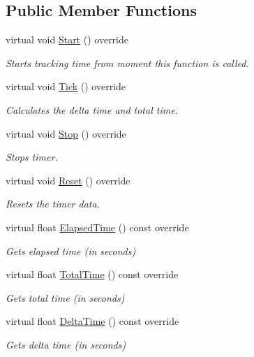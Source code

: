 \subsection*{Public Member Functions}
\begin{DoxyCompactItemize}
\item 
virtual void \hyperlink{classHatchit_1_1Core_1_1Windows_1_1Timer_a6441edbd90a09f4cfbca01fafd4d0aff}{Start} () override
\begin{DoxyCompactList}\small\item\em Starts tracking time from moment this function is called. \end{DoxyCompactList}\item 
virtual void \hyperlink{classHatchit_1_1Core_1_1Windows_1_1Timer_ae1879dac284fc160b0322f5a57aa8ae3}{Tick} () override
\begin{DoxyCompactList}\small\item\em Calculates the delta time and total time. \end{DoxyCompactList}\item 
virtual void \hyperlink{classHatchit_1_1Core_1_1Windows_1_1Timer_a1d9f06759a7a48e807d4b2a0254e7dbc}{Stop} () override
\begin{DoxyCompactList}\small\item\em Stops timer. \end{DoxyCompactList}\item 
virtual void \hyperlink{classHatchit_1_1Core_1_1Windows_1_1Timer_a464c6b3e3017867bd387a8fb477ad186}{Reset} () override
\begin{DoxyCompactList}\small\item\em Resets the timer data. \end{DoxyCompactList}\item 
virtual float \hyperlink{classHatchit_1_1Core_1_1Windows_1_1Timer_a4cda627adbe26e6f2b5438681063995e}{Elapsed\+Time} () const override
\begin{DoxyCompactList}\small\item\em Gets elapsed time (in seconds) \end{DoxyCompactList}\item 
virtual float \hyperlink{classHatchit_1_1Core_1_1Windows_1_1Timer_a5cc4dcb2292ef3e12a5855990c296ab7}{Total\+Time} () const override
\begin{DoxyCompactList}\small\item\em Gets total time (in seconds) \end{DoxyCompactList}\item 
virtual float \hyperlink{classHatchit_1_1Core_1_1Windows_1_1Timer_a79a80293593eb0d0785e896bbf7c934b}{Delta\+Time} () const override
\begin{DoxyCompactList}\small\item\em Gets delta time (in seconds) \end{DoxyCompactList}\end{DoxyCompactItemize}
